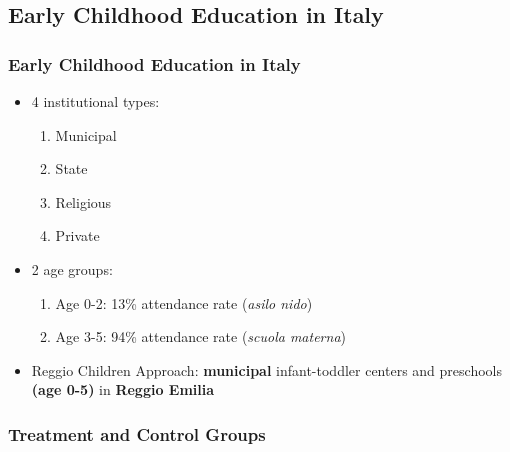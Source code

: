 \documentclass[xcolor=table]{beamer}
\begin{document}
\subsection{Early Childhood Education in Italy}\label{sec:ECE_IT}
\begin{frame}
\frametitle{Early Childhood Education in Italy}\label{frame:ECE_IT}
\begin{itemize}
	\item 4 institutional types: \hyperlink{fig:PrivateAsiloIT}{}
	\begin{enumerate}
		\item Municipal
		\item State
		\item Religious
		\item Private
	\end{enumerate}
	\vspace{1ex}
	\item 2 age groups: \hyperlink{fig:AttendaceAsiloIT}{}
	\begin{enumerate}
		\item Age 0-2: 13\% attendance rate (\textit{asilo nido})
		\item Age 3-5: 94\% attendance rate (\textit{scuola materna})
	\end{enumerate}
	
	\vspace{3ex}
	
	\item[] Reggio Children Approach: \textbf{municipal} infant-toddler centers and preschools \textbf{(age 0-5)} in \textbf{Reggio Emilia}
\end{itemize} 
\end{frame} 
\begin{frame}
\frametitle{Treatment and Control Groups}

\end{frame}
\end{document}

